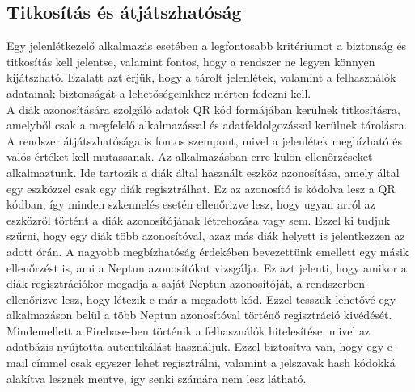 \documentclass[12pt]{article}
\numberwithin{figure}{section}
\numberwithin{equation}{section}
\begin{document}
\subsection{Titkosítás és átjátszhatóság}
Egy jelenlétkezelő alkalmazás esetében a legfontosabb kritériumot a biztonság és titkosítás kell jelentse, valamint fontos, hogy a rendszer ne legyen könnyen kijátszható. Ezalatt azt érjük, hogy a tárolt jelenlétek, valamint a felhasználók adatainak biztonságát a lehetőségeinkhez mérten fedezni kell.\\
A diák azonosítására szolgáló adatok QR kód formájában kerülnek titkosításra, amelyből csak a megfelelő alkalmazással és adatfeldolgozással kerülnek tárolásra.\\
A rendszer átjátszhatósága is fontos szempont, mivel a jelenlétek megbízható és valós értéket kell mutassanak. Az alkalmazásban erre külön ellenőrzéseket alkalmaztunk. Ide tartozik a diák által használt eszköz azonosítása, amely által egy eszközzel csak egy diák regisztrálhat. Ez az azonosító is kódolva lesz a QR kódban, így minden szkennelés esetén ellenőrizve lesz, hogy ugyan arról az eszközről történt a diák azonosítójának létrehozása vagy sem. Ezzel ki tudjuk szűrni, hogy egy diák több azonosítóval, azaz más diák helyett is jelentkezzen az adott órán. A nagyobb megbízhatóság érdekében bevezettünk emellett egy másik ellenőrzést is, ami a Neptun azonosítókat vizsgálja. Ez azt jelenti, hogy amikor a diák regisztrációkor megadja a saját Neptun azonosítóját, a rendszerben ellenőrizve lesz, hogy létezik-e már a megadott kód. Ezzel tesszük lehetővé egy alkalmazáson belül a több Neptun azonosítóval történő regisztráció kivédését.\\
Mindemellett a Firebase-ben történik a felhasználók hitelesítése, mivel az adatbázis nyújtotta autentikálást használjuk. Ezzel biztosítva van, hogy egy e-mail címmel csak egyszer lehet regisztrálni, valamint a jelszavak hash kódokká alakítva lesznek mentve, így senki számára nem lesz látható.\\
\end{document}
